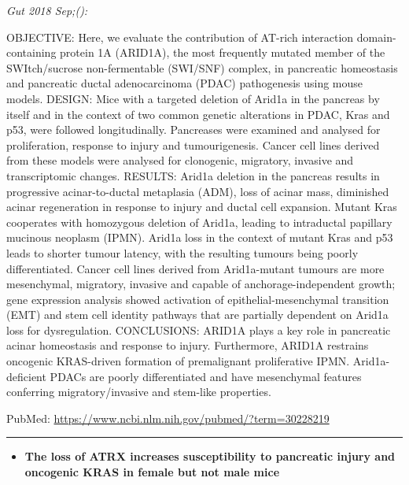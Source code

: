 \documentclass[]{article}
\providecommand{\tightlist}{%
  \setlength{\itemsep}{0pt}\setlength{\parskip}{0pt}}
\begin{document}
\emph{Gut 2018 Sep;():}

OBJECTIVE: Here, we evaluate the contribution of AT-rich interaction
domain-containing protein 1A (ARID1A), the most frequently mutated
member of the SWItch/sucrose non-fermentable (SWI/SNF) complex, in
pancreatic homeostasis and pancreatic ductal adenocarcinoma (PDAC)
pathogenesis using mouse models. DESIGN: Mice with a targeted deletion
of Arid1a in the pancreas by itself and in the context of two common
genetic alterations in PDAC, Kras and p53, were followed longitudinally.
Pancreases were examined and analysed for proliferation, response to
injury and tumourigenesis. Cancer cell lines derived from these models
were analysed for clonogenic, migratory, invasive and transcriptomic
changes. RESULTS: Arid1a deletion in the pancreas results in progressive
acinar-to-ductal metaplasia (ADM), loss of acinar mass, diminished
acinar regeneration in response to injury and ductal cell expansion.
Mutant Kras cooperates with homozygous deletion of Arid1a, leading to
intraductal papillary mucinous neoplasm (IPMN). Arid1a loss in the
context of mutant Kras and p53 leads to shorter tumour latency, with the
resulting tumours being poorly differentiated. Cancer cell lines derived
from Arid1a-mutant tumours are more mesenchymal, migratory, invasive and
capable of anchorage-independent growth; gene expression analysis showed
activation of epithelial-mesenchymal transition (EMT) and stem cell
identity pathways that are partially dependent on Arid1a loss for
dysregulation. CONCLUSIONS: ARID1A plays a key role in pancreatic acinar
homeostasis and response to injury. Furthermore, ARID1A restrains
oncogenic KRAS-driven formation of premalignant proliferative IPMN.
Arid1a-deficient PDACs are poorly differentiated and have mesenchymal
features conferring migratory/invasive and stem-like properties.

PubMed: \url{https://www.ncbi.nlm.nih.gov/pubmed/?term=30228219}

{}

{}

\begin{center}\rule{0.5\linewidth}{\linethickness}\end{center}

\begin{itemize}
\tightlist
\item
  \textbf{The loss of ATRX increases susceptibility to pancreatic injury
  and oncogenic KRAS in female but not male mice}
\end{itemize}
\end{document}
